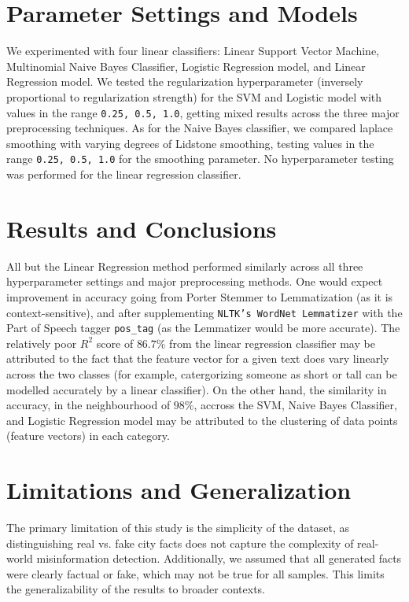 \documentclass[11pt]{article}
\begin{document}
\section{Parameter Settings and Models}
We experimented with four linear classifiers: Linear Support Vector Machine, Multinomial Naive Bayes Classifier, 
Logistic Regression model, and Linear Regression model. We tested the regularization 
hyperparameter (inversely proportional to regularization strength) 
for the SVM and Logistic model with values in the range \texttt{0.25, 0.5, 1.0}, 
getting mixed results across the three major preprocessing techniques. 
As for the Naive Bayes classifier, we compared laplace smoothing with varying degrees of Lidstone smoothing,
testing values in the range \texttt{{0.25, 0.5, 1.0}} for the smoothing parameter.
No hyperparameter testing was performed for the linear regression classifier.

\section{Results and Conclusions}
All but the Linear Regression method
performed similarly across all three hyperparameter settings 
and major preprocessing methods. 
One would expect improvement in accuracy going from 
Porter Stemmer to Lemmatization 
(as it is context-sensitive),
and after supplementing \texttt{NLTK's WordNet Lemmatizer} 
with the Part of Speech tagger \texttt{pos\_tag}
(as the Lemmatizer would be more accurate). The relatively 
poor $R^2$ score of $86.7\%$ from the linear regression classifier
may be attributed to the fact that the feature vector for a 
given text does vary linearly across the two classes 
(for example, catergorizing someone as short or tall can 
be modelled accurately by a linear classifier). On the other hand,
the similarity in accuracy, in the neighbourhood of $98\%$, accross the 
SVM, Naive Bayes Classifier, and Logistic Regression model may be attributed
to the clustering of data points (feature vectors) in each category.

\section{Limitations and Generalization}
The primary limitation of this study is the simplicity of the dataset, as distinguishing real vs. fake city facts does not capture the complexity of real-world misinformation detection. Additionally, we assumed that all generated facts were clearly factual or fake, which may not be true for all samples. This limits the generalizability of the results to broader contexts.
\end{document}

